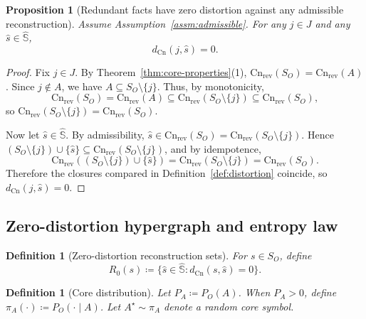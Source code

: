 \documentclass[twoside]{article}
\newtheorem{definition}[theorem]{Definition}
\newtheorem{proposition}[theorem]{Proposition}
\newcommand{\Cn}{\mathrm{Cn}}
\newcommand{\1}{\mathbf{1}}
\begin{document}
\begin{proposition}[Redundant facts have zero distortion against any admissible reconstruction]
\label{prop:redundant-zero}
Assume Assumption~\ref{assm:admissible}. For any \(j\in J\) and any \(\hat{s}\in \hat{\mathbb{S}}\),
\[
d_{\Cn}(j,\hat{s})=0.
\]
\end{proposition}

\begin{proof}
Fix \(j\in J\). By Theorem~\ref{thm:core-properties}(1), \(\Cn_{\mathrm{rev}}(S_O)=\Cn_{\mathrm{rev}}(A)\).
Since \(j\notin A\), we have \(A\subseteq S_O\setminus\{j\}\). Thus, by monotonicity,
\[
\Cn_{\mathrm{rev}}(S_O)=\Cn_{\mathrm{rev}}(A)\subseteq \Cn_{\mathrm{rev}}(S_O\setminus\{j\})\subseteq \Cn_{\mathrm{rev}}(S_O),
\]
so \(\Cn_{\mathrm{rev}}(S_O\setminus\{j\})=\Cn_{\mathrm{rev}}(S_O)\).

Now let \(\hat{s}\in\hat{\mathbb{S}}\). By admissibility, \(\hat{s}\in \Cn_{\mathrm{rev}}(S_O)=\Cn_{\mathrm{rev}}(S_O\setminus\{j\})\).
Hence \((S_O\setminus\{j\})\cup\{\hat{s}\}\subseteq \Cn_{\mathrm{rev}}(S_O\setminus\{j\})\), and by idempotence,
\[
\Cn_{\mathrm{rev}}((S_O\setminus\{j\})\cup\{\hat{s}\})=\Cn_{\mathrm{rev}}(S_O\setminus\{j\})=\Cn_{\mathrm{rev}}(S_O).
\]
Therefore the closures compared in Definition~\ref{def:distortion} coincide, so \(d_{\Cn}(j,\hat{s})=0\).
\end{proof}

\subsection{Zero-distortion hypergraph and entropy law}
\label{sec:hypergraph}

\begin{definition}[Zero-distortion reconstruction sets]
\label{def:zero-set}
For \(s\in S_O\), define
\[
R_0(s)\coloneqq \{ \hat{s}\in\hat{\mathbb{S}} : d_{\Cn}(s,\hat{s})=0\}.
\]
\end{definition}

\begin{definition}[Core distribution]
\label{def:core-dist}
Let \(P_A\coloneqq P_O(A)\). When \(P_A>0\), define \(\pi_A(\cdot)\coloneqq P_O(\cdot \mid A)\).
Let \(A^\star\sim \pi_A\) denote a random core symbol.
\end{definition}
\end{document}
